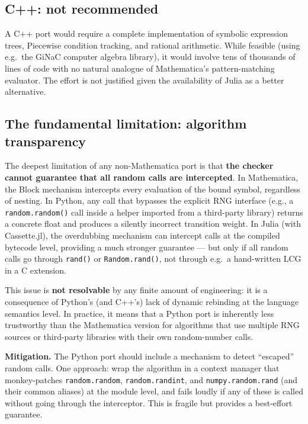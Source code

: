 \documentclass[12pt,a4paper]{article}
\theoremstyle{critical}
\theoremstyle{remark}
\theoremstyle{verified}
\begin{document}
\subsection{C++: not recommended}

A C++ port would require a complete implementation of symbolic expression trees,
Piecewise condition tracking, and rational arithmetic.  While feasible (using
e.g.\ the GiNaC computer algebra library), it would involve tens of thousands of
lines of code with no natural analogue of Mathematica's pattern-matching evaluator.
The effort is not justified given the availability of Julia as a better
alternative.

\subsection{The fundamental limitation: algorithm transparency}

The deepest limitation of any non-Mathematica port is that \textbf{the checker
cannot guarantee that all random calls are intercepted}.  In Mathematica, the
Block mechanism intercepts every evaluation of the bound symbol, regardless of
nesting.  In Python, any call that bypasses the explicit RNG interface (e.g., a
\texttt{random.random()} call inside a helper imported from a third-party library)
returns a concrete float and produces a silently incorrect transition weight.  In
Julia (with Cassette.jl), the overdubbing mechanism can intercept calls at the
compiled bytecode level, providing a much stronger guarantee --- but only if all
random calls go through \texttt{rand()} or \texttt{Random.rand()}, not through
e.g.\ a hand-written LCG in a C extension.

This issue is \textbf{not resolvable} by any finite amount of engineering: it is
a consequence of Python's (and C++'s) lack of dynamic rebinding at the language
semantics level.  In practice, it means that a Python port is inherently less
trustworthy than the Mathematica version for algorithms that use multiple RNG
sources or third-party libraries with their own random-number calls.

\textbf{Mitigation.}  The Python port should include a mechanism to detect
``escaped'' random calls.  One approach: wrap the algorithm in a context manager
that monkey-patches \texttt{random.random}, \texttt{random.randint}, and
\texttt{numpy.random.rand} (and their common aliases) at the module level, and
fails loudly if any of these is called without going through the interceptor.
This is fragile but provides a best-effort guarantee.
\end{document}
